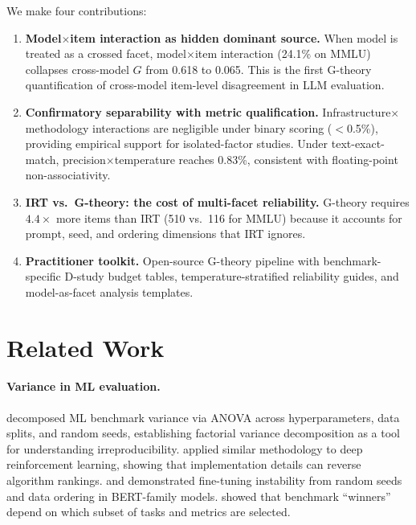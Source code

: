 \documentclass[letterpaper]{article}
\newcommand{\gcoeff}{\ensuremath{G}}
\newcommand{\pct}{\%}
\begin{document}
We make four contributions:
\begin{enumerate}
    \item \textbf{Model$\times$item interaction as hidden dominant source.} When model is treated as a crossed facet, model$\times$item interaction (24.1\pct{} on MMLU) collapses cross-model $\gcoeff{}$ from 0.618 to 0.065. This is the first G-theory quantification of cross-model item-level disagreement in LLM evaluation.
    \item \textbf{Confirmatory separability with metric qualification.} Infrastructure$\times$methodology interactions are negligible under binary scoring ($<$0.5\pct{}), providing empirical support for isolated-factor studies. Under text-exact-match, precision$\times$temperature reaches 0.83\pct{}, consistent with floating-point non-associativity.
    \item \textbf{IRT vs.\ G-theory: the cost of multi-facet reliability.} G-theory requires $4.4\times$ more items than IRT (510 vs.\ 116 for MMLU) because it accounts for prompt, seed, and ordering dimensions that IRT ignores.
    \item \textbf{Practitioner toolkit.} Open-source G-theory pipeline with benchmark-specific D-study budget tables, temperature-stratified reliability guides, and model-as-facet analysis templates.
\end{enumerate}

\section{Related Work}

\paragraph{Variance in ML evaluation.}
\citet{bouthillier2021} decomposed ML benchmark variance via ANOVA across hyperparameters, data splits, and random seeds, establishing factorial variance decomposition as a tool for understanding irreproducibility.
\citet{henderson2018} applied similar methodology to deep reinforcement learning, showing that implementation details can reverse algorithm rankings.
\citet{dodge2020} and \citet{sellam2022} demonstrated fine-tuning instability from random seeds and data ordering in BERT-family models.
\citet{dehghani2021} showed that benchmark ``winners'' depend on which subset of tasks and metrics are selected.
\end{document}
